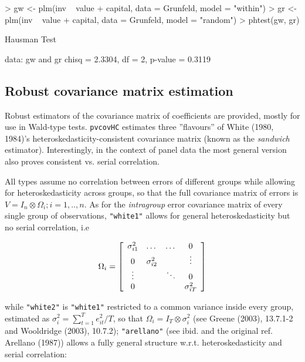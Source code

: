 \documentclass[a4paper]{article}
\begin{document}
\begin{Schunk}
\begin{Sinput}
> gw <- plm(inv ~ value + capital, data = Grunfeld, model = "within")
> gr <- plm(inv ~ value + capital, data = Grunfeld, model = "random")
> phtest(gw, gr)
\end{Sinput}
\begin{Soutput}
	Hausman Test

data:  gw and gr 
chisq = 2.3304, df = 2, p-value = 0.3119
\end{Soutput}
\end{Schunk}


\subsection{Robust covariance matrix estimation}
Robust estimators of the covariance matrix of coefficients are provided, mostly for use in Wald-type tests. \texttt{pvcovHC} estimates three ''flavours'' of White (1980, 1984)'s heteroskedasticity-consistent covariance matrix (known as the \emph{sandwich} estimator). Interestingly, in the context of panel data the most general version also proves consistent vs. serial correlation.

All types assume no correlation between errors of different groups while allowing for heteroskedasticity across groups, so that the full covariance matrix of errors is $  V=I_n \otimes \Omega_i;  i=1,..,n$. As for the \emph{intragroup} error covariance matrix of every single group of observations, \texttt{"white1"} allows for general heteroskedasticity but no serial correlation, i.e

\begin{equation}
 \label{eq:omegaW1}
 \Omega_i=
 \left[ \begin{array}{c c c c}
 \sigma_{i1}^2 & \dots & \dots & 0 \\
 0 & \sigma_{i2}^2 & & \vdots \\
 \vdots & & \ddots & 0 \\
 0 & & & \sigma_{iT}^2 \\
 \end{array} \right]
\end{equation}

while \texttt{"white2"} is \texttt{"white1"} restricted to a common variance inside every group, estimated as $\sigma_i^2=\sum_{t=1}^T{e_{it}^2}/T$, so that $\Omega_i=I_T \otimes \sigma_i^2$ (see Greene (2003), 13.7.1-2 and Wooldridge (2003), 10.7.2); \texttt{"arellano"} (see ibid. and the original ref. Arellano (1987)) allows a fully general structure w.r.t. heteroskedasticity and serial correlation:
\end{document}
